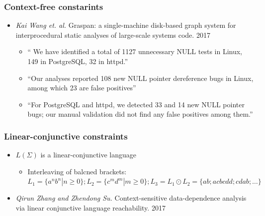 \documentclass[xcolor=table,aspectratio=169]{beamer}
\begin{document}
\begin{frame}
  \transwipe[direction=90]
  \frametitle{Context-free constarints}

\begin{itemize} 
\item \emph{Kai Wang et. al.} Graspan: a single-machine disk-based graph system for interprocedural 
static analyses of large-scale systems code. 2017
  
\begin{itemize} 
   \item `` We have identified a total of 1127 unnecessary NULL tests in Linux, 149 in PostgreSQL, 
   32 in httpd.''
   \item ``Our analyses reported 108 new NULL pointer dereference bugs in Linux, among which 23 are false positives''
   \item ``For PostgreSQL and httpd, we detected 33 and 14 new NULL pointer bugs; our manual 
   validation did not find any false positives among them.''
\end{itemize}

\end{itemize}

\end{frame}

\begin{frame}
  \transwipe[direction=90]
  \frametitle{Linear-conjunctive constraints}

\begin{itemize} 
  \item $L(\Sigma)$ is a linear-conjunctive language
    \begin{itemize} 
      \item Interleaving of balcned brackets: $L_1 = \{a^n b^n | n \geq 0\}; L_2 = \{c^m d^m | m \geq 0\}; L_3 = L_1 \odot L_2 = \{a b; a c b c d d; c d a b;  \dots\}$
    \end{itemize}

  \item \emph{Qirun Zhang and Zhendong Su.} Context-sensitive data-dependence analysis via linear conjunctive language reachability. 2017
  
\end{itemize}

\end{frame}
\end{document}
